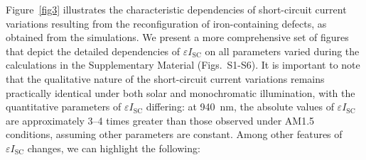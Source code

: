 \documentclass[a4paper,fleqn]{cas-sc}
\begin{document}
Figure~\ref{fig3} illustrates the characteristic dependencies of short-circuit current variations resulting 
from the reconfiguration of iron-containing defects, as obtained from the simulations. 
We present a more comprehensive set of figures that depict the detailed dependencies of $\varepsilon I_\mathrm{SC}$ on 
all parameters varied during the calculations in the Supplementary Material (Figs.~S1-S6). 
It is important to note that the qualitative nature of the short-circuit current variations remains practically identical 
under both solar and monochromatic illumination, with the quantitative parameters of $\varepsilon I_\mathrm{SC}$ differing: 
at 940~nm, the absolute values of $\varepsilon I_\mathrm{SC}$ are approximately 3--4 times greater than those observed under AM1.5 conditions, 
assuming other parameters are constant. 
Among other features of $\varepsilon I_\mathrm{SC}$ changes, we can highlight the following:
\end{document}

